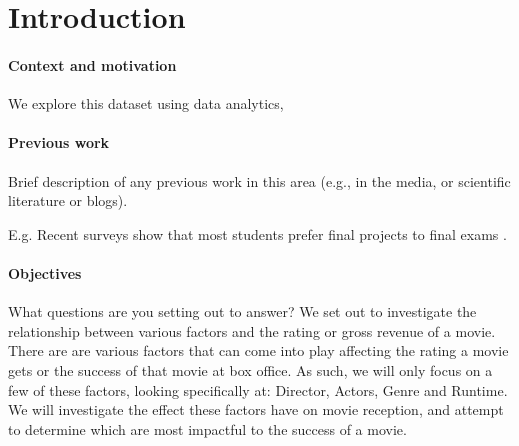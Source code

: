 \section{Introduction}

    \paragraph{Context and motivation}
        We explore this dataset using data analytics,

            \paragraph{Previous work} Brief description of any previous work in this area
                (e.g., in the media, or scientific literature or blogs).

        E.g. Recent surveys show that most students prefer final projects to final
            exams \cite{Space2021}.

    \paragraph{Objectives}
        What questions are you setting out to answer?
        We set out to investigate the relationship between various factors and the
            rating or gross revenue of a movie.
        There are are various factors that can come into play affecting the rating a
            movie gets or the success of that movie at box office.
        As such, we will only focus on a few of these factors, looking specifically at:
        Director, Actors, Genre and Runtime.
        We will investigate the effect these factors have on movie reception, and
            attempt to determine which are most impactful to the success of a movie.
